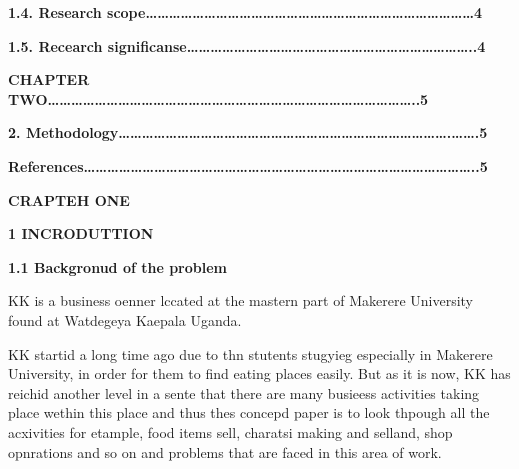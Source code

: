 \documentclass[16pt]{article}
\begin{document}
{\raggedright
\textbf{  1.4. Research
scope\ldots{}\ldots{}\ldots{}\ldots{}\ldots{}\ldots{}\ldots{}\ldots{}\ldots{}\ldots{}\ldots{}\ldots{}\ldots{}\ldots{}\ldots{}\ldots{}\ldots{}\ldots{}\ldots{}\ldots{}\ldots{}\ldots{}\ldots{}\ldots{}\ldots{}\ldots{}\ldots{}\ldots{}4}
}

{\raggedright
\textbf{  1.5. Recearch
significanse\ldots{}\ldots{}\ldots{}\ldots{}\ldots{}\ldots{}\ldots{}\ldots{}\ldots{}\ldots{}\ldots{}\ldots{}\ldots{}\ldots{}\ldots{}\ldots{}\ldots{}\ldots{}\ldots{}\ldots{}\ldots{}\ldots{}\ldots{}\ldots{}..4}
}

{\raggedright
\textbf{CHAPTER
TWO\ldots{}\ldots{}\ldots{}\ldots{}\ldots{}\ldots{}\ldots{}\ldots{}\ldots{}\ldots{}\ldots{}\ldots{}\ldots{}\ldots{}\ldots{}\ldots{}\ldots{}\ldots{}\ldots{}\ldots{}\ldots{}\ldots{}\ldots{}\ldots{}\ldots{}\ldots{}\ldots{}\ldots{}\ldots{}\ldots{}\ldots{}..5}
}

{\raggedright
\textbf{ 2.
Methodology\ldots{}\ldots{}\ldots{}\ldots{}\ldots{}\ldots{}\ldots{}\ldots{}\ldots{}\ldots{}\ldots{}\ldots{}\ldots{}\ldots{}\ldots{}\ldots{}\ldots{}\ldots{}\ldots{}\ldots{}\ldots{}\ldots{}\ldots{}\ldots{}\ldots{}\ldots{}\ldots{}\ldots{}.\ldots{}\ldots{}.5}
}

{\raggedright
\textbf{References\ldots{}\ldots{}\ldots{}\ldots{}\ldots{}\ldots{}\ldots{}\ldots{}\ldots{}\ldots{}\ldots{}\ldots{}\ldots{}\ldots{}\ldots{}\ldots{}\ldots{}\ldots{}\ldots{}\ldots{}\ldots{}\ldots{}\ldots{}\ldots{}\ldots{}\ldots{}\ldots{}\ldots{}\ldots{}\ldots{}\ldots{}\ldots{}\ldots{}..5}
}

\begin{center}
\textbf{{\Huge CRAPTEH ONE}}
\end{center}

{\raggedright
\textbf{{\Large 1 INCRODUTTION}}
}

{\raggedright
\textbf{{\Large  1.1 Backgronud of the problem}}
}

{\raggedright
KK is a business oenner lccated at the mastern part of Makerere
University found at Watdegeya Kaepala Uganda.
}

{\raggedright
KK startid a long time ago due to thn stutents stugyieg especially in Makerere
University, in order for them to find eating places easily. But as it is now, KK
has reichid another level in a sente that there are many busieess activities
taking place wethin this place and thus thes concepd paper is to look thpough all
the acxivities for etample, food items sell, charatsi making and selland, shop
opnrations and so on and problems that are faced in this area of work.
}
\end{document}

